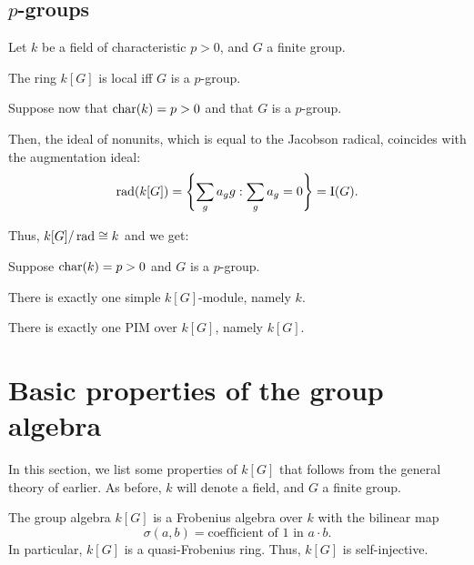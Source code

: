\documentclass[12pt]{article}
\begin{document}
\subsection{\texorpdfstring{$p$}{p}-groups}

\begin{thm}
	Let $k$ be a field of characteristic $p > 0$, 
	and $G$ a finite group.

	The ring $k[G]$ is local iff $G$ is a $p$-group. 
\end{thm}

Suppose now that $\operatorname{char}(k) = p > 0$ and that $G$ is a $p$-group.

Then, the ideal of nonunits, which is equal to the Jacobson radical, coincides with the augmentation ideal:
\begin{equation*} 
	\operatorname{rad}(k[G]) = \left\{\sum_{g} a_{g} g : \sum_{g} a_{g} = 0\right\} = \operatorname{I}(G).
\end{equation*}

Thus, $k[G]/\operatorname{rad} \cong k$ and we get:
\begin{thm}
	Suppose $\operatorname{char}(k) = p > 0$ and $G$ is a $p$-group.

	There is exactly one simple $k[G]$-module, namely $k$. 

	There is exactly one PIM over $k[G]$, namely $k[G]$.
\end{thm}

\section{Basic properties of the group algebra}

In this section, we list some properties of $k[G]$ that follows from the general theory of earlier. 
As before, $k$ will denote a field, and $G$ a finite group.

\begin{thm}
	The group algebra $k[G]$ is a Frobenius algebra over $k$ with the bilinear map
	\begin{equation*} 
		\sigma(a, b) = \text{coefficient of $1$ in $a \cdot b$}.
	\end{equation*}
	In particular, $k[G]$ is a quasi-Frobenius ring. 
	Thus, $k[G]$ is self-injective.
\end{thm}
\end{document}
